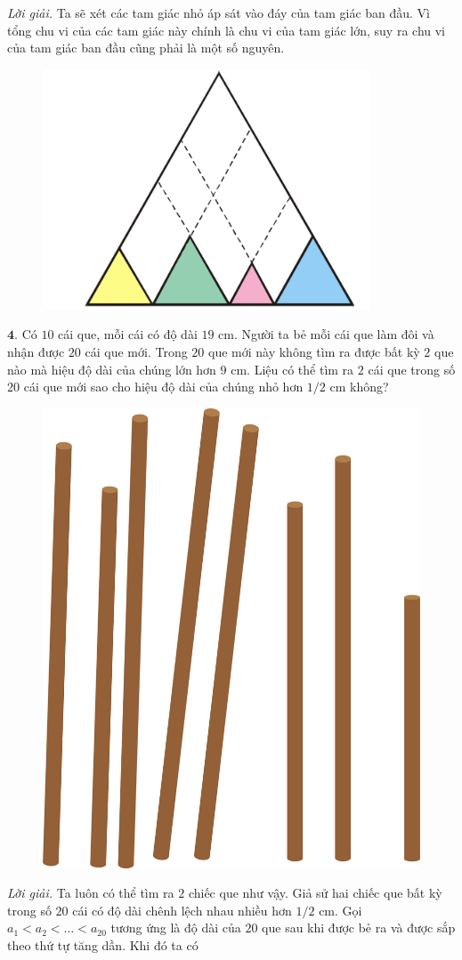 \begin{multicols}{2}
\begin{figure}[H]
		\vspace*{-10pt}
	\end{figure}
	\textit{Lời giải.} Ta sẽ xét các tam giác nhỏ áp sát vào đáy của tam giác ban đầu. Vì tổng chu vi của các tam giác này chính là chu vi của tam giác lớn, suy ra chu vi của tam giác ban đầu cũng phải là một số nguyên.
	\begin{figure}[H]
		\centering
		\vspace*{-10pt}
		\captionsetup{labelformat= empty, justification=centering}
		\includegraphics[width=0.5\linewidth]{bai3_2}
		\vspace*{-10pt}
	\end{figure}
	$\pmb{4.}$ Có $10$ cái que, mỗi cái có độ dài $19$ cm. Người ta bẻ  mỗi cái que làm đôi  và nhận được $20$ cái que mới. Trong $20$ que mới này không tìm ra được bất kỳ $2$ que nào mà hiệu độ dài của chúng lớn hơn $9$ cm. Liệu có thể tìm ra $2$ cái que trong số $20$ cái que mới sao cho hiệu độ dài của chúng nhỏ hơn $1/2$ cm không?
	\begin{figure}[H]
		\centering
		\vspace*{-10pt}
		\captionsetup{labelformat= empty, justification=centering}
		\includegraphics[width=0.4\linewidth]{Pi3_Bai4}
		\vspace*{-10pt}
	\end{figure}
	\textit{Lời giải.} 	Ta luôn có thể tìm ra $2$ chiếc que như vậy. Giả sử hai chiếc que bất kỳ trong số $20$ cái có độ dài chênh lệch nhau nhiều hơn $1/2$ cm. Gọi $a_1< a_2< \ldots < a_{20}$ tương ứng là độ dài của $20$ que sau khi được bẻ ra và được sắp theo thứ tự tăng dần.  Khi đó ta có 

\end{multicols}

